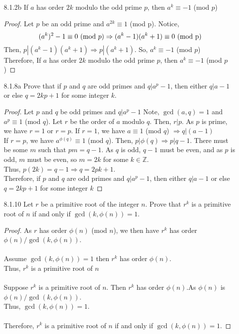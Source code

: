 \documentclass[12pt]{article}
\newcommand{\Z}{\mathds{Z}}
\begin{document}
\begin{enumerate}
	\item[8.1.2b] If $ a $ has order $ 2k $ modulo the odd prime $ p $, then $ a^k \equiv -1 $ (mod $ p $)
		\begin{proof}
			Let $ p $ be an odd prime and $ a^{2k} \equiv 1$ (mod p). Notice, 
			\[(a^k)^2-1 \equiv 0 \text{ (mod $ p $)}\Rightarrow (a^k-1)(a^k+1)\equiv 0 \text{ (mod p)}\]
			Then, $ p | (a^k-1)(a^k+1) \Rightarrow p|(a^k+1)$. So, $ a^k\equiv -1 $ (mod $ p $)\\
			Therefore, If $ a $ has order $ 2k $ modulo the odd prime $ p $, then $ a^k \equiv -1 $ (mod $ p $)
		\end{proof}
	\item[8.1.8a] Prove that if $ p $ and $ q $ are odd primes and $ q|a^p-1 $, then either $ q|a-1 $ or else $ q=2kp+1 $ for some integer $ k $.
	\begin{proof}
		Let $ p $ and $ q $ be odd primes and $ q|a^p-1 $ Note, $ \gcd(a,q)=1 $ and $ a^p\equiv 1 $ (mod $ q $). Let $ r $ be the order of $ a $ modulo $ q $. Then, $ r|p $. As $ p $ is prime, we have $ r=1 $ or $ r=p $.
		If $ r =1 $, we have $ a\equiv 1 $ (mod $ q $) $ \Rightarrow q|(a-1) $\\
		If $ r=p $, we have $ a^{\phi(q)} \equiv 1 $ (mod $ q $). Then, $ p|\phi(q) \Rightarrow p|q-1 $. There must be some $ m $ such that $ pm=q-1 $. As $ q $ is odd, $ q-1 $ must be even, and as $ p $ is odd, $ m $ must be even, so $ m=2k $ for some $ k\in\Z $.\\
		Thus, $ p(2k)=q-1 \Rightarrow q=2pk+1 $. \\
		Therefore,  if $ p $ and $ q $ are odd primes and $ q|a^p-1 $, then either $ q|a-1 $ or else $ q=2kp+1 $ for some integer $ k $
	\end{proof} 
	\item[8.1.10] Let $ r $ be a primitive root of the integer $ n $. Prove that $ r^k $ is a primitive root of $ n $ if and only if $ \gcd(k,\phi(n))= 1 $.
	\begin{proof}
		As $ r $ has order $ \phi(n) $ (mod $ n $), we then have $ r^k $ has order $ \phi(n)/ \gcd(k,\phi(n)) $. \\
		\\
		Assume $ \gcd(k,\phi(n))=1 $ then $ r^k $ has order $ \phi(n) $.\\
		Thus, $ r^k $ is a primitive root of $ n $\\
		\\
		Suppose $ r^k $ is a primitive root of $ n $. Then $ r^k $ has order $ \phi(n) $.As $ \phi(n) $ is $ \phi(n)/\gcd(k,\phi(n))$. \\
		Thus, $ \gcd(k,\phi(n))=1 $.\\
		\\
		Therefore, $ r^k $ is a primitive root of $ n $ if and only if $ \gcd(k,\phi(n))= 1 $.
	\end{proof}
\end{enumerate}
\end{document}
